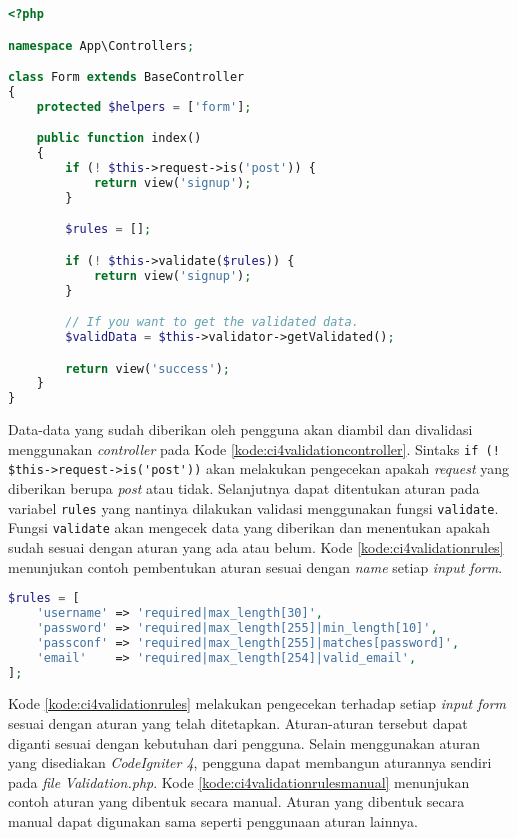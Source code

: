 \begin{lstlisting}[language=PHP, caption=Contoh kode untuk melakukan validasi data yang sudah dikumpulkan. ,label=kode:ci4validationcontroller]
<?php

namespace App\Controllers;

class Form extends BaseController
{
    protected $helpers = ['form'];

    public function index()
    {
        if (! $this->request->is('post')) {
            return view('signup');
        }

        $rules = [];

        if (! $this->validate($rules)) {
            return view('signup');
        }

        // If you want to get the validated data.
        $validData = $this->validator->getValidated();

        return view('success');
    }
}
\end{lstlisting}
Data-data yang sudah diberikan oleh pengguna akan diambil dan divalidasi menggunakan \textit{controller} pada Kode \ref{kode:ci4validationcontroller}. Sintaks \verb|if (! $this->request->is('post'))| akan melakukan pengecekan apakah \textit{request} yang diberikan berupa \textit{post} atau tidak. Selanjutnya dapat ditentukan aturan pada variabel \texttt{rules} yang nantinya dilakukan validasi menggunakan fungsi \texttt{validate}. Fungsi \texttt{validate} akan mengecek data yang diberikan dan menentukan apakah sudah sesuai dengan aturan yang ada atau belum. Kode \ref{kode:ci4validationrules} menunjukan contoh pembentukan aturan sesuai dengan \textit{name} setiap \textit{input form}.

\begin{lstlisting}[language=PHP, caption=Contoh kode untuk menetapkan aturan untuk validasi data yang sudah dikumpulkan. ,label=kode:ci4validationrules]
$rules = [
    'username' => 'required|max_length[30]',
    'password' => 'required|max_length[255]|min_length[10]',
    'passconf' => 'required|max_length[255]|matches[password]',
    'email'    => 'required|max_length[254]|valid_email',
];
\end{lstlisting}

Kode \ref{kode:ci4validationrules} melakukan pengecekan terhadap setiap \textit{input form} sesuai dengan aturan yang telah ditetapkan. Aturan-aturan tersebut dapat diganti sesuai dengan kebutuhan dari pengguna. Selain menggunakan aturan yang disediakan \textit{CodeIgniter 4}, pengguna dapat membangun aturannya sendiri pada \textit{file} \textit{Validation.php}. Kode \ref{kode:ci4validationrulesmanual} menunjukan contoh aturan yang dibentuk secara manual. Aturan yang dibentuk secara manual dapat digunakan sama seperti penggunaan aturan lainnya.

